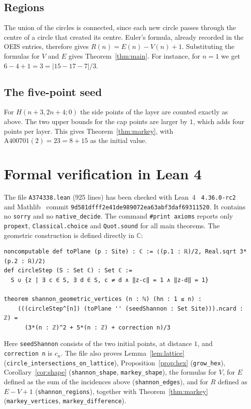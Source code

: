 \documentclass[11pt,a4paper]{amsart}
\theoremstyle{definition}
\theoremstyle{remark}
\begin{document}
\subsection{Regions} The union of the circles is connected, since each new circle passes through the centre of a circle that created its centre. Euler's formula, already recorded in the OEIS entries, therefore gives $R(n)=E(n)-V(n)+1$. Substituting the formulas for $V$ and $E$ gives Theorem~\ref{thm:main}. For instance, for $n=1$ we get $6-4+1=3=|15-17-7|/3$.

\subsection{The five-point seed} For $H(n+3,2n+4;0)$ the side points of the layer are counted exactly as above. The two upper bounds for the cap points are larger by $1$, which adds four points per layer. This gives Theorem~\ref{thm:markey}, with $\mathrm{A400701}(2)=23=8+15$ as the initial value.

\section{Formal verification in Lean 4}

The file \texttt{A374338.lean} (925 lines) has been checked with Lean~4~\cite{lean4} \texttt{4.36.0-rc2} and Mathlib~\cite{mathlib} commit \texttt{9d581dff\allowbreak f2e41de989072ea63abf3daf69311520}. It contains no \texttt{sorry} and no \texttt{native\_decide}. The command \texttt{\#print axioms} reports only \texttt{propext}, \texttt{Classical.choice} and \texttt{Quot.sound} for all main theorems. The geometric construction is defined directly in $\mathbb{C}$:
\begin{lstlisting}
noncomputable def toPlane (p : Site) : ℂ := ⟨(p.1 : ℝ)/2, Real.sqrt 3*(p.2 : ℝ)/2⟩
def circleStep (S : Set ℂ) : Set ℂ :=
  S ∪ {z | ∃ c ∈ S, ∃ d ∈ S, c ≠ d ∧ ‖z-c‖ = 1 ∧ ‖z-d‖ = 1}

theorem shannon_geometric_vertices (n : ℕ) (hn : 1 ≤ n) :
    (((circleStep^[n]) (toPlane '' (seedShannon : Set Site))).ncard : ℤ) =
      (3*(n : ℤ)^2 + 5*(n : ℤ) + correction n)/3
\end{lstlisting}
Here \texttt{seedShannon} consists of the two initial points, at distance $1$, and \texttt{correction n} is $c_n$. The file also proves Lemma~\ref{lem:lattice} (\texttt{circle\_intersections\_on\_lattice}), Proposition~\ref{prop:hex} (\texttt{grow\_hex}), Corollary~\ref{cor:shape} (\texttt{shannon\_shape}, \texttt{markey\_shape}), the formulas for $V$, for $E$ defined as the sum of the incidences above (\texttt{shannon\_edges}), and for $R$ defined as $E-V+1$ (\texttt{shannon\_regions}), together with Theorem~\ref{thm:markey} (\texttt{markey\_vertices}, \texttt{markey\_difference}).
\end{document}
